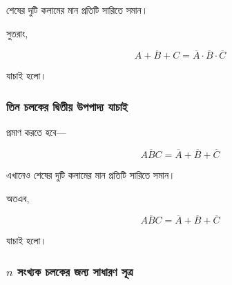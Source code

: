 শেষের দুটি কলামের মান প্রতিটি সারিতে সমান।

সুতরাং,

\[
\boxed{
\overline{A+B+C}
=
\overline{A}\cdot
\overline{B}\cdot
\overline{C}
}
\]

যাচাই হলো।


\subsubsection*{তিন চলকের দ্বিতীয় উপপাদ্য যাচাই}

প্রমাণ করতে হবে—

\[
\overline{ABC}
=
\overline{A}+
\overline{B}+
\overline{C}
\]

\begin{center}
\scriptsize
{}
\end{center}

এখানেও শেষের দুটি কলামের মান প্রতিটি সারিতে সমান।

অতএব,

\[
\boxed{
\overline{ABC}
=
\overline{A}+
\overline{B}+
\overline{C}
}
\]

যাচাই হলো।


\subsubsection*{\(n\) সংখ্যক চলকের জন্য সাধারণ সূত্র}

